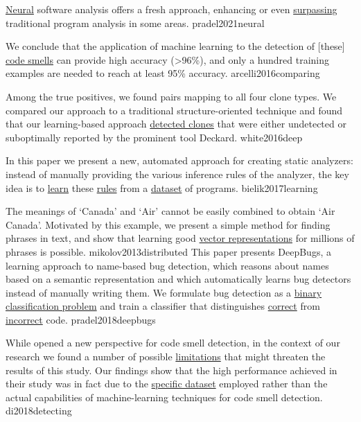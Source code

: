 \documentclass{article}
\begin{document}

  {\ul{Neural} software analysis offers a fresh approach, enhancing or even \ul{surpassing} traditional program analysis in some areas.}
  {pradel2021neural}

  {We conclude that the application of machine learning to the detection of [these] \ul{code smells} can provide high accuracy (>96\%), and only a hundred training examples are needed to reach at least 95\% accuracy.}
  {arcelli2016comparing}

  {Among the true positives, we found pairs mapping to all four clone types. We compared our approach to a traditional structure-oriented technique and found that our learning-based approach \ul{detected clones} that were either undetected or suboptimally reported by the prominent tool Deckard.}
  {white2016deep}

  {In this paper we present a new, automated approach for creating static analyzers: instead of manually providing the various inference rules of the analyzer, the key idea is to \ul{learn} these \ul{rules} from a \ul{dataset} of programs.}
  {bielik2017learning}

  {The meanings of `Canada' and `Air' cannot be easily combined to obtain `Air Canada'. Motivated by this example, we present a simple method for finding phrases in text, and show that learning good \ul{vector representations} for millions of phrases is possible.}
  {mikolov2013distributed}
  {This paper presents DeepBugs, a learning approach to name-based bug detection, which reasons about names based on a semantic representation and which automatically learns bug detectors instead of manually writing them. We formulate bug detection as a \ul{binary classification problem} and train a classifier that distinguishes \ul{correct} from \ul{incorrect} code.}
  {pradel2018deepbugs}

  {While \citet{arcelli2016comparing} opened a new perspective for code smell detection, in the context of our research we found a number of possible \ul{limitations} that might threaten the results of this study. Our findings show that the high performance achieved in their study was in fact due to the \ul{specific dataset} employed rather than the actual capabilities of machine-learning techniques for code smell detection.}
  {di2018detecting}
\end{document}
